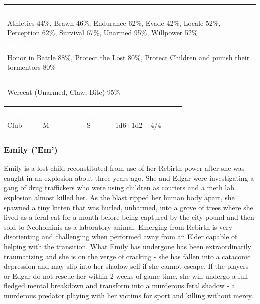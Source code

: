 \documentclass[letterpaper,serif]{rpg-module}
\begin{document}
\begin{tabularx}{\linewidth}{X}
\rowcolor{gray}
\textcolor{white}{\textbf{Skills}} \\
Athletics 44\%, Brawn 46\%, Endurance 62\%, Evade 42\%, Locale 52\%, Perception 62\%, Survival 67\%, Unarmed 95\%, Willpower 52\%\\
\rowcolor{gray}
\textcolor{white}{\textbf{Passions}} \\
Honor in Battle 88\%, Protect the Lost 80\%, Protect Children and punish their tormentors 80\% \\
\rowcolor{gray}
\textcolor{white}{\textbf{Combat Styles \& Weapons}} \\
Werecat (Unarmed, Claw, Bite) 95\%
\end{tabularx}
\begin{tabularx}{\linewidth}{XXXXX}
\rowcolor{gray}
\textcolor{white}{\textbf{Weapon}} & \textcolor{white}{\textbf{Size/Force}} & \textcolor{white}{\textbf{Reach}} & \textcolor{white}{\textbf{Damage}} & \textcolor{white}{\textbf{AP/HP}} \\
Club & M & S & 1d6+1d2 & 4/4
\end{tabularx}

\subsubsection{Emily ('Em')}

Emily is a lost child reconstituted from use of her Rebirth power after she was caught in an explosion about three years ago. She and Edgar were investigating a gang of drug traffickers who were using children as couriers and a meth lab explosion almost killed her. As the blast ripped her human body apart, she spawned a tiny kitten that was hurled, unharmed, into a grove of trees where she lived as a feral cat for a month before being captured by the city pound and then sold to Neohominis as a laboratory animal. Emerging from Rebirth is very disorienting and challenging when performed away from an Elder capable of helping with the transition. What Emily has undergone has been extraordinarily traumatizing and she is on the verge of cracking - she has fallen into a cataconic depression and may slip into her shadow self if she cannot escape. If the players or Edgar do not rescue her within 2 weeks of game time, she will undergo a full-fledged mental breakdown and transform into a murderous feral shadow - a murderous predator playing with her victims for sport and killing without mercy.  
\end{document}
